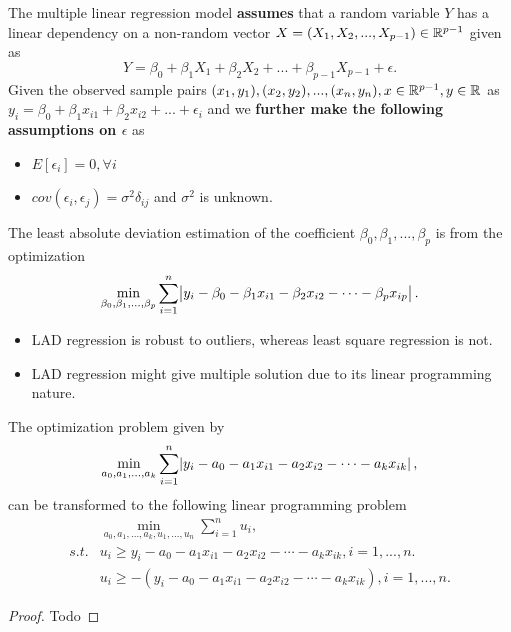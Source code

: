 \begin{refsection}
\begin{definition}\label{ch:statistical-models:th:multipleLinearRegressionLeastAbsoluteDeviation}	The multiple linear regression model \textbf{assumes} that a random variable $Y$ has a linear dependency on a non-random vector $X = (X_1,X_2,...,X_{p-1}) \in \mathbb{R}^{p-1}$ given as
	$$Y = \beta_0 + \beta_1 X_1 +\beta_2 X_2 + ... +\beta_{p-1} X_{p-1} + \epsilon.$$
	Given the observed sample pairs $(x_1,y_1),(x_2,y_2),..., (x_n,y_n), x\in \mathbb{R}^{p-1}, y\in \mathbb{R}$ as $y_i = \beta_0 + \beta_1 x_{i1} + \beta_2 x_{i2} + ... + \epsilon_i$ and we \textbf{further make the following assumptions on $\epsilon$} as
	\begin{itemize}
		\item $E[\epsilon_i] = 0,\forall i$
		\item $cov(\epsilon_i,\epsilon_j) = \sigma^2\delta_{ij}$ and $\sigma^2$ is unknown.
	\end{itemize} 	
	
	The least absolute deviation estimation of the coefficient $\beta_0,\beta_1,...,\beta_p$ is from the optimization
	$$\min_{\beta_0,\beta_1,...,\beta_p} \sum_{i=1}^{n} \abs{y_i - \beta_0 - \beta_1 x_{i1} - \beta_2 x_{i2} - \cdots -\beta_p x_{ip}}.$$
\end{definition}

\begin{remark}\hfill
\begin{itemize}
	\item LAD regression is robust to outliers, whereas least square regression is not.
	\item LAD regression might give multiple solution due to its linear programming nature.
\end{itemize}	
\end{remark}


\begin{lemma}
The optimization problem given by
$$\min_{a_0,a_1,...,a_k} \sum_{i=1}^{n} \abs{y_i - a_0 - a_1 x_{i1} - a_2 x_{i2} - \cdots -a_k x_{ik}},$$
can be transformed to the following linear programming problem
\begin{align*}
&\min_{a_0,a_1,...,a_k, u_1,...,u_n} \sum_{i=1}^{n} u_i ,\\
s.t. & u_i \geq y_i - a_0 -a_1x_{i1} -a_2x_{i2} - \cdots -a_kx_{ik}, i=1,...,n. \\
& u_i \geq -(y_i - a_0 -a_1x_{i1} -a_2x_{i2} - \cdots -a_kx_{ik}), i=1,...,n. 
\end{align*}
\end{lemma}
\begin{proof}
Todo
\end{proof}



\end{refsection}
